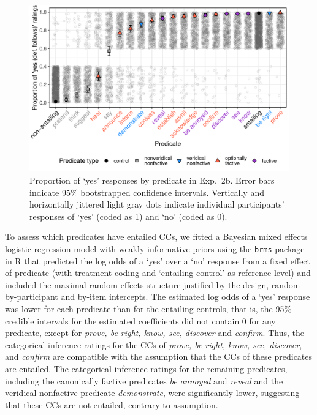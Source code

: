 \documentclass{language}
\newcommand{\6}{\mbox{$[\hspace*{-.6mm}[$}}
\newcommand{\9}{\mbox{$]\hspace*{-.6mm}]$}}
\begin{document}
\begin{figure}[h!]
\centering
\includegraphics[width=.7\paperwidth]{Language-figures/color/Figure11}

\caption{Proportion of `yes' responses by predicate in Exp.~2b. Error bars indicate 95\% bootstrapped confidence intervals. Vertically and horizontally jittered light gray dots indicate individual participants' responses of `yes' (coded as 1) and `no' (coded as 0).}
\label{fig:2bresults}
\end{figure}

To assess which predicates have entailed CCs, we fitted a Bayesian mixed effects logistic regression model with weakly informative priors using the \verb|brms|  package in R that predicted the log odds of a `yes' over a `no' response from a fixed effect of predicate (with treatment coding and `entailing control' as  reference level) and included the maximal random effects structure justified by the design, random by-participant and by-item intercepts. The estimated log odds of a `yes' response was lower for each predicate than for the entailing controls, that is, the 95\% credible intervals for the estimated coefficients did not contain 0 for any predicate, except for {\em prove, be right, know, see, discover} and {\em confirm}. Thus, the categorical inference ratings for the CCs of {\em prove, be right, know, see, discover}, and {\em confirm} are compatible with the assumption that the CCs of these predicates are entailed. The categorical inference ratings for the remaining predicates, including the canonically factive predicates {\em be annoyed} and {\em reveal} and the veridical nonfactive predicate {\em demonstrate}, were significantly lower, suggesting that these CCs are not entailed, contrary to assumption. 
\end{document}
